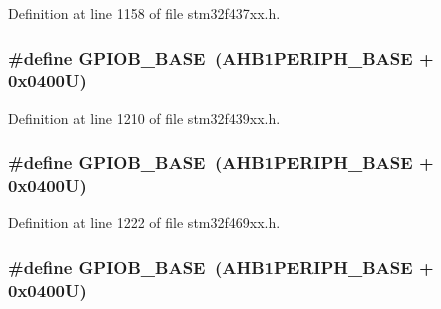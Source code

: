 Definition at line 1158 of file stm32f437xx.\+h.

\subsubsection[{\texorpdfstring{G\+P\+I\+O\+B\+\_\+\+B\+A\+SE}{GPIOB_BASE}}]{\setlength{\rightskip}{0pt plus 5cm}\#define G\+P\+I\+O\+B\+\_\+\+B\+A\+SE~({\bf A\+H\+B1\+P\+E\+R\+I\+P\+H\+\_\+\+B\+A\+SE} + 0x0400\+U)}\hypertarget{group___peripheral__memory__map_gac944a89eb789000ece920c0f89cb6a68}{}\label{group___peripheral__memory__map_gac944a89eb789000ece920c0f89cb6a68}


Definition at line 1210 of file stm32f439xx.\+h.

\subsubsection[{\texorpdfstring{G\+P\+I\+O\+B\+\_\+\+B\+A\+SE}{GPIOB_BASE}}]{\setlength{\rightskip}{0pt plus 5cm}\#define G\+P\+I\+O\+B\+\_\+\+B\+A\+SE~({\bf A\+H\+B1\+P\+E\+R\+I\+P\+H\+\_\+\+B\+A\+SE} + 0x0400\+U)}\hypertarget{group___peripheral__memory__map_gac944a89eb789000ece920c0f89cb6a68}{}\label{group___peripheral__memory__map_gac944a89eb789000ece920c0f89cb6a68}


Definition at line 1222 of file stm32f469xx.\+h.

\subsubsection[{\texorpdfstring{G\+P\+I\+O\+B\+\_\+\+B\+A\+SE}{GPIOB_BASE}}]{\setlength{\rightskip}{0pt plus 5cm}\#define G\+P\+I\+O\+B\+\_\+\+B\+A\+SE~({\bf A\+H\+B1\+P\+E\+R\+I\+P\+H\+\_\+\+B\+A\+SE} + 0x0400\+U)}\hypertarget{group___peripheral__memory__map_gac944a89eb789000ece920c0f89cb6a68}{}\label{group___peripheral__memory__map_gac944a89eb789000ece920c0f89cb6a68}


